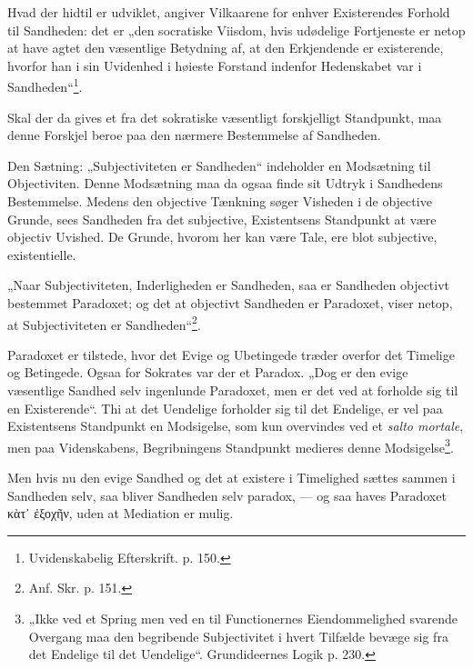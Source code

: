 \documentclass[12pt,a4paper]{book}
\newcommand{\opage}[1]{\marginnote{\footnotesize\textit{[#1]}}}
\begin{document}
Hvad der hidtil er udviklet, angiver Vilkaarene for enhver Existerendes Forhold til Sandheden: det er „den socratiske Viisdom, hvis udødelige Fortjeneste er netop at have agtet den væsentlige Betydning af, at den Erkjendende er existerende, hvorfor han i sin Uvidenhed i høieste Forstand indenfor Hedenskabet var i Sandheden“\footnote{Uvidenskabelig Efterskrift. p. 150.}.

Skal der da gives et fra det sokratiske væsentligt forskjelligt Standpunkt, maa denne Forskjel beroe paa den nærmere Bestemmelse af Sandheden.

Den Sætning: „Subjectiviteten er Sandheden“ indeholder en Modsætning til
Objectiviten. Denne Modsætning maa da ogsaa finde sit Udtryk i Sandhedens Bestemmelse. Medens
\opage{23}\setcounter{footnote}{0}%
den objective Tænkning søger Visheden i de objective Grunde, sees Sandheden fra det subjective, Existentsens Standpunkt at være objectiv Uvished. De Grunde, hvorom her kan være Tale, ere blot subjective, existentielle.

„Naar Subjectiviteten, Inderligheden er Sandheden, saa er Sandheden objectivt bestemmet Paradoxet; og det at objectivt Sandheden er Paradoxet, viser netop, at Subjectiviteten er Sandheden“\footnote{Anf. Skr. p. 151.}.

Paradoxet er tilstede, hvor det Evige og Ubetingede træder overfor det Timelige og Betingede. Ogsaa for Sokrates var der et Paradox. „Dog er den evige væsentlige Sandhed selv ingenlunde Paradoxet, men er det ved at forholde sig til en Existerende“. Thi at det Uendelige forholder sig til det Endelige, er vel paa Existentsens Standpunkt en Modsigelse, som kun overvindes ved et \textit{salto mortale}, men paa Videnskabens, Begribningens Standpunkt medieres denne Modsigelse\footnote{„Ikke ved et Spring men ved en til Functionernes Eiendommelighed svarende Overgang maa den begribende Subjectivitet i hvert Tilfælde bevæge sig fra det Endelige til det Uendelige“. Grundideernes Logik p. 230.}.

Men hvis nu den evige Sandhed og det at existere i Timelighed sættes sammen i Sandheden selv, saa bliver Sandheden selv paradox, --- og saa haves Paradoxet κὰτ᾽ ἐξοχῆν, uden at Mediation er mulig.
\end{document}
